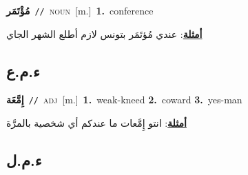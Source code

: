 \documentclass[10pt,a4paper,twoside]{article} %
\begin{document}
\begin{multicols}{2}
{\setlength\topsep{0pt}\textbf{\foreignlanguage{arabic}{مُؤْتَمَر}}\ {\color{gray}\texttt{//}\color{black}}\ \textsc{noun}\ [m.]\ \textbf{1.}~conference\  \begin{flushright}\color{gray}\foreignlanguage{arabic}{\textbf{\underline{\foreignlanguage{arabic}{أمثلة}}}: عندي مُؤتَمَر بتونس لازم أطلع الشهر الجاي}\end{flushright}\color{black}} \vspace{2mm}

\vspace{-3mm}
\subsection*{\color{blue}\foreignlanguage{arabic}{ء.م.ع}\color{blue}{}} 

{\setlength\topsep{0pt}\textbf{\foreignlanguage{arabic}{إِمَّعَة}}\ {\color{gray}\texttt{//}\color{black}}\ \textsc{adj}\ [m.]\ \textbf{1.}~weak-kneed  \textbf{2.}~coward  \textbf{3.}~yes-man\  \begin{flushright}\color{gray}\foreignlanguage{arabic}{\textbf{\underline{\foreignlanguage{arabic}{أمثلة}}}: انتو إِمَّعات ما عندكم أي شخصية بالمرَّة}\end{flushright}\color{black}} \vspace{2mm}

\vspace{-3mm}
\subsection*{\color{blue}\foreignlanguage{arabic}{ء.م.ل}\color{blue}{}} 


\end{multicols}
\end{document}

